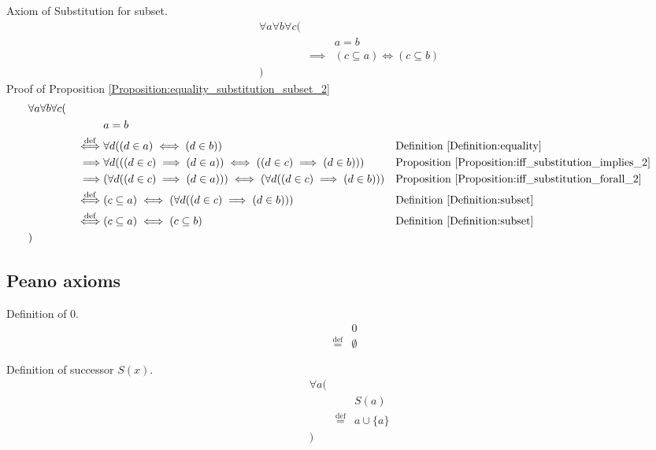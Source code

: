 \begin{prop}
\label{Proposition:equality_substitution_subset_2}
Axiom of Substitution for subset.
\begin{align*}
& \forall a \forall b \forall c ( \\
& & & a = b \\
& & \implies & (c \subseteq a) \iff (c \subseteq b) \\
& )
\end{align*}
Proof of Proposition \ref{Proposition:equality_substitution_subset_2}
\begin{align*}
& \forall a \forall b \forall c ( \\
& & & a = b \\
& & \overset{\operatorname{def}}{\iff} & \forall d ((d \in a) \iff (d \in b))
& & \text{Definition \ref{Definition:equality}} \\
& & \implies & \forall d (((d \in c) \implies (d \in a)) \iff ((d \in c) \implies (d \in b)))
& & \text{Proposition \ref{Proposition:iff_substitution_implies_2}} \\
& & \implies & (\forall d ((d \in c) \implies (d \in a))) \iff (\forall d ((d \in c) \implies (d \in b)))
& & \text{Proposition \ref{Proposition:iff_substitution_forall_2}} \\
& & \overset{\operatorname{def}}{\iff} & (c \subseteq a) \iff (\forall d ((d \in c) \implies (d \in b)))
& & \text{Definition \ref{Definition:subset}} \\
& & \overset{\operatorname{def}}{\iff} & (c \subseteq a) \iff (c \subseteq b)
& & \text{Definition \ref{Definition:subset}} \\
& )
\end{align*}
\end{prop}

\subsection{Peano axioms}
\begin{defn}
\label{Definition:zero}
Definition of 0.
\begin{align*}
& 0 \\
\overset{\operatorname{def}}{=} & \emptyset
\end{align*}
\end{defn}

\begin{defn}
\label{Definition:successor}
Definition of successor $S(x)$.
\begin{align*}
& \forall a ( \\
& & & S(a) \\
& & \overset{\operatorname{def}}{=} & a \cup \{ a \} \\
& )
\end{align*}
\end{defn}


